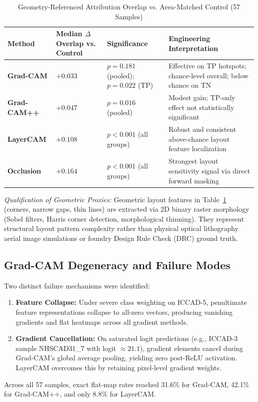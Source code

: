 \documentclass[conference]{IEEEtran}
\begin{document}
\begin{table}[t]
\caption{Geometry-Referenced Attribution Overlap vs. Area-Matched Control (57 Samples)}
\label{tab:geometry_xai}
\centering
\setlength{\tabcolsep}{3pt}
\begin{tabular}{p{}p{}p{}p{}}
\toprule
\textbf{Method} & \textbf{Median $\Delta$ Overlap vs. Control} & \textbf{Significance} & \textbf{Engineering Interpretation} \\
\midrule
\textbf{Grad-CAM} & $+0.033$ & $p=0.181$ (pooled); $p=0.022$ (TP) & Effective on TP hotspots; chance-level overall; below chance on TN \\
\textbf{Grad-CAM++} & $+0.047$ & $p=0.016$ (pooled) & Modest gain; TP-only effect not statistically significant \\
\textbf{LayerCAM} & $+0.108$ & $p<0.001$ (all groups) & Robust and consistent above-chance layout feature localization \\
\textbf{Occlusion} & $+0.164$ & $p<0.001$ (all groups) & Strongest layout sensitivity signal via direct forward masking \\
\bottomrule
\end{tabular}
\end{table}

\textit{Qualification of Geometric Proxies:} Geometric layout features in Table~\ref{tab:geometry_xai} (corners, narrow gaps, thin lines) are extracted via 2D binary raster morphology (Sobel filters, Harris corner detection, morphological thinning). They represent structural layout pattern complexity rather than physical optical lithography aerial image simulations or foundry Design Rule Check (DRC) ground truth.

\subsection{Grad-CAM Degeneracy and Failure Modes}
Two distinct failure mechanisms were identified:
\begin{enumerate}
    \item \textbf{Feature Collapse:} Under severe class weighting on ICCAD-5, penultimate feature representations collapse to all-zero vectors, producing vanishing gradients and flat heatmaps across all gradient methods.
    \item \textbf{Gradient Cancellation:} On saturated logit predictions (e.g., ICCAD-3 sample NHSCAD31\_7 with logit $\approx 21.1$), gradient elements cancel during Grad-CAM's global average pooling, yielding zero post-ReLU activation. LayerCAM overcomes this by retaining pixel-level gradient weights.
\end{enumerate}
Across all 57 samples, exact flat-map rates reached 31.6\% for Grad-CAM, 42.1\% for Grad-CAM++, and only 8.8\% for LayerCAM.
\end{document}
